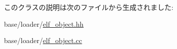 このクラスの説明は次のファイルから生成されました:\begin{DoxyCompactItemize}
\item 
base/loader/\hyperlink{elf__object_8hh}{elf\_\-object.hh}\item 
base/loader/\hyperlink{elf__object_8cc}{elf\_\-object.cc}\end{DoxyCompactItemize}
